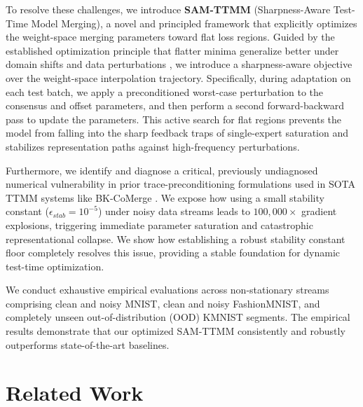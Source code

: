 \documentclass{article}
\theoremstyle{plain}
\theoremstyle{definition}
\theoremstyle{remark}
\begin{document}
To resolve these challenges, we introduce \textbf{SAM-TTMM} (Sharpness-Aware Test-Time Model Merging), a novel and principled framework that explicitly optimizes the weight-space merging parameters toward flat loss regions. Guided by the established optimization principle that flatter minima generalize better under domain shifts and data perturbations \cite{foret2020sharpness}, we introduce a sharpness-aware objective over the weight-space interpolation trajectory. Specifically, during adaptation on each test batch, we apply a preconditioned worst-case perturbation to the consensus and offset parameters, and then perform a second forward-backward pass to update the parameters. This active search for flat regions prevents the model from falling into the sharp feedback traps of single-expert saturation and stabilizes representation paths against high-frequency perturbations.

Furthermore, we identify and diagnose a critical, previously undiagnosed numerical vulnerability in prior trace-preconditioning formulations used in SOTA TTMM systems like BK-CoMerge \cite{bkcomerge2026}. We expose how using a small stability constant ($\epsilon_{stab} = 10^{-5}$) under noisy data streams leads to $100,000\times$ gradient explosions, triggering immediate parameter saturation and catastrophic representational collapse. We show how establishing a robust stability constant floor completely resolves this issue, providing a stable foundation for dynamic test-time optimization.

We conduct exhaustive empirical evaluations across non-stationary streams comprising clean and noisy MNIST, clean and noisy FashionMNIST, and completely unseen out-of-distribution (OOD) KMNIST segments. The empirical results demonstrate that our optimized SAM-TTMM consistently and robustly outperforms state-of-the-art baselines.

\section{Related Work}
\label{sec:related}
\end{document}
